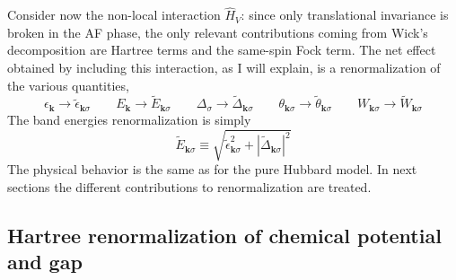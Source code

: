 Consider now the non-local interaction $\hat H_V$: since only translational invariance is broken in the AF phase, the only relevant contributions coming from Wick's decomposition are Hartree terms and the same-spin Fock term. The net effect obtained by including this interaction, as I will explain, is a renormalization of the various quantities,
\[
	\epsilon_\mathbf{k} \to \tilde{\epsilon}_{\mathbf{k}\sigma}
	\qquad
	E_\mathbf{k} \to \tilde{E}_{\mathbf{k}\sigma}
	\qquad
	\Delta_\sigma \to \tilde{\Delta}_{\mathbf{k}\sigma}
	\qquad
	\theta_{\mathbf{k}\sigma} \to \tilde{\theta}_{\mathbf{k}\sigma}
	\qquad
	W_{\mathbf{k}\sigma} \to \tilde{W}_{\mathbf{k}\sigma}
\]
The band energies renormalization is simply
\[
	\tilde{E}_{\mathbf{k}\sigma} \equiv \sqrt{\tilde{\epsilon}_{\mathbf{k}\sigma}^2 + |\tilde{\Delta}_{\mathbf{k}\sigma}|^2}
\]
The physical behavior is the same as for the pure Hubbard model. In next sections the different contributions to renormalization are treated.

\subsection{Hartree renormalization of chemical potential and gap}

